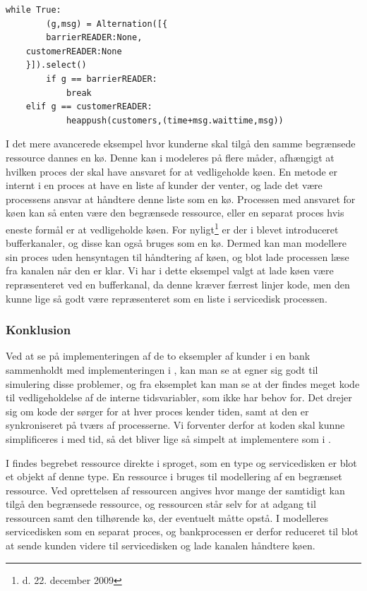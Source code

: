 \begin{lstlisting}[float=hbtp,label=bank-alternation-imp,caption=Modtage en 
  kunde eller barrierekald i Bankprocessen]
while True:
		(g,msg) = Alternation([{
		barrierREADER:None,
    customerREADER:None
    }]).select()
		if g == barrierREADER:
			break
    elif g == customerREADER:
			heappush(customers,(time+msg.waittime,msg))
\end{lstlisting}


I det mere avancerede eksempel hvor kunderne skal tilgå den samme begrænsede 
ressource dannes en kø. Denne kan i \pycsp modeleres på flere måder, afhængigt 
at hvilken proces der skal have ansvaret for at vedligeholde køen. En metode er 
internt i en proces at have en liste af kunder der venter, og lade det være 
processens ansvar at håndtere denne liste som en kø. Processen med ansvaret for køen kan 
så enten være den begrænsede ressource, eller en separat proces hvis eneste 
formål er at vedligeholde køen. For nyligt\footnote{d. 22. december 2009} er 
der i \pycsp blevet introduceret bufferkanaler\cite{pycsp-r147}, og 
disse kan også bruges som en kø. Dermed kan man modellere sin proces uden 
hensyntagen til håndtering af køen, og blot lade processen læse fra kanalen når den er klar. Vi har i dette eksempel valgt 
at lade køen være repræsenteret ved en bufferkanal, da denne  kræver 
færrest linjer kode, men den kunne lige så godt være repræsenteret som en liste 
i servicedisk processen.


\subsubsection{Konklusion}
Ved at se på implementeringen af de to eksempler af kunder i en bank sammenholdt med implementeringen i \simpy, kan man se at \des  egner sig godt til 
simulering disse problemer, og fra eksemplet kan man se at der findes meget kode til 
vedligeholdelse af de interne tidsvariabler, som \simpy ikke har behov for. Det drejer sig 
om kode der sørger for at hver proces kender tiden, samt at den er 
synkroniseret på tværs af processerne. Vi forventer derfor at koden skal kunne 
simplificeres i \pycsp med tid, så det bliver lige så simpelt at implementere som i 
\simpy. 

I \simpy findes begrebet ressource direkte i sproget, som en type og servicedisken er blot et objekt af denne type. 
En ressource i \simpy bruges til modellering af en begrænset ressource. Ved oprettelsen af ressourcen angives hvor mange der samtidigt kan tilgå den begrænsede ressource, og ressourcen står selv for at adgang til ressourcen samt den tilhørende kø, der eventuelt måtte opstå. 
I \pycsp modelleres servicedisken som en separat proces, og 
bankprocessen er derfor reduceret til blot at sende kunden videre til 
servicedisken og lade kanalen håndtere køen. 

